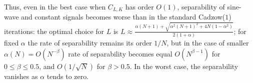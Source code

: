 \documentclass[sii]{ipart}
\newtheorem{proposition}{Proposition}
\begin{document}
Thus, even in the best case when $C_{L,K}$ has order $O(1)$, separability of sine-wave and constant signals becomes worse than in the standard Cadzow($1$) iterations: the optimal choice for $L$ is $L \approx \frac{\alpha(N + 1) + \sqrt{\alpha^2(N+1)^2 + 4N(1  - \alpha^2)}}{2(1 + \alpha)}$; for fixed $\alpha$ the rate of separability remains its order $1/N$, but in the case of smaller $\alpha(N) = O(N^{-\beta})$ rate of separability becomes equal $O(N^{\beta - 1})$ for $0 \le \beta \le 0.5$, and $O(1/\sqrt{N})$ for $\beta > 0.5$.
In the worst case, the separability vanishes as $\alpha$ tends to zero.

%
%
\end{document}
